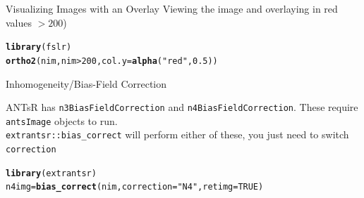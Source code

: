 \documentclass[11pt]{beamer}\usepackage[]{graphicx}\usepackage[]{color}
\makeatletter
\newcommand{\hlnum}[1]{\textcolor[rgb]{0.686,0.059,0.569}{#1}}%
\newcommand{\hlstr}[1]{\textcolor[rgb]{0.192,0.494,0.8}{#1}}%
\newcommand{\hlopt}[1]{\textcolor[rgb]{0,0,0}{#1}}%
\newcommand{\hlstd}[1]{\textcolor[rgb]{0.345,0.345,0.345}{#1}}%
\newcommand{\hlkwb}[1]{\textcolor[rgb]{0.69,0.353,0.396}{#1}}%
\newcommand{\hlkwc}[1]{\textcolor[rgb]{0.333,0.667,0.333}{#1}}%
\newcommand{\hlkwd}[1]{\textcolor[rgb]{0.737,0.353,0.396}{\textbf{#1}}}%
\newenvironment{kframe}{%
 \def\at@end@of@kframe{}%
 \ifinner\ifhmode%
  \def\at@end@of@kframe{\end{minipage}}%
  \begin{minipage}{\columnwidth}%
 \fi\fi%
 \def\FrameCommand##1{\hskip\@totalleftmargin \hskip-\fboxsep
 \colorbox{shadecolor}{##1}\hskip-\fboxsep
     \hskip-\linewidth \hskip-\@totalleftmargin \hskip\columnwidth}%
 \MakeFramed {\advance\hsize-\width
   \@totalleftmargin\z@ \linewidth\hsize
   \@setminipage}}%
 {\par\unskip\endMakeFramed%
 \at@end@of@kframe}
\newenvironment{knitrout}{}{} %
\makeatother
\begin{document}
\begin{frame}[fragile]{Visualizing Images with an Overlay}
Viewing the image and overlaying in red values $> 200$)
\begin{knitrout}
\color{fgcolor}\begin{kframe}
\begin{alltt}
\hlkwd{library}\hlstd{(fslr)}
\hlkwd{ortho2}\hlstd{(nim, nim} \hlopt{>} \hlnum{200}\hlstd{,} \hlkwc{col.y}\hlstd{=}\hlkwd{alpha}\hlstd{(}\hlstr{"red"}\hlstd{,} \hlnum{0.5}\hlstd{))}
\end{alltt}
\end{kframe}
\end{knitrout}

\end{frame}


\begin{frame}[fragile]{Inhomogeneity/Bias-Field Correction}

ANTsR has \verb|n3BiasFieldCorrection| and \verb|n4BiasFieldCorrection|.  These require \verb|antsImage| objects to run.  \\

\vspace{0.5in}
\verb|extrantsr::bias_correct| will perform either of these, you just need to switch \verb|correction|


\begin{knitrout}
\color{fgcolor}\begin{kframe}
\begin{alltt}
\hlkwd{library}\hlstd{(extrantsr)}
\hlstd{n4img} \hlkwb{=} \hlkwd{bias_correct}\hlstd{(nim,} \hlkwc{correction} \hlstd{=}\hlstr{"N4"}\hlstd{,} \hlkwc{retimg}\hlstd{=}\hlnum{TRUE}\hlstd{)}
\end{alltt}
\end{kframe}
\end{knitrout}
\end{frame}
\end{document}
